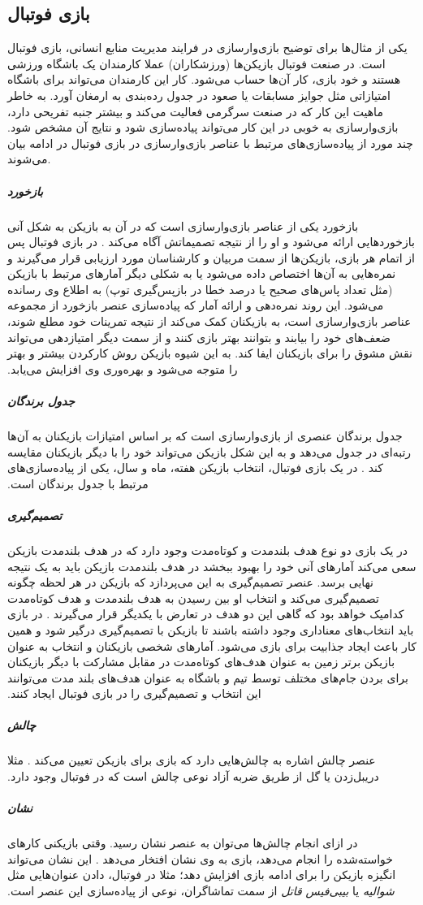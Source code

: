 \subsection{بازی فوتبال}
یکی از مثال‌ها برای توضیح بازی‌وارسازی در فرایند مدیریت منابع انسانی، بازی فوتبال است. در صنعت فوتبال بازیکن‌ها (ورزشکاران) عملا کارمندان یک باشگاه ورزشی هستند و خود بازی، کار آن‌ها حساب می‌شود. کار این کارمندان می‌تواند برای باشگاه امتیازاتی مثل جوایز مسابقات یا صعود در جدول رده‌بندی به ارمغان آورد.
به خاطر ماهیت این کار که در صنعت سرگرمی فعالیت می‌کند و بیشتر جنبه تفریحی دارد، بازی‌وارسازی به خوبی در این کار می‌تواند پیاده‌سازی شود و نتایج آن مشخص شود. چند مورد از پیاده‌سازی‌های مرتبط با عناصر بازی‌وارسازی در بازی فوتبال در ادامه بیان می‌شوند.
\subparagraph{بازخورد}‫
بازخورد یکی از عناصر بازی‌وارسازی است که در آن به بازیکن به شکل آنی بازخوردهایی ارائه می‌شود و او را از نتیجه تصمیماتش آگاه می‌کند \cite{atoz}. در بازی فوتبال پس از اتمام هر بازی، بازیکن‌ها از سمت مربیان و کارشناسان مورد ارزیابی قرار می‌گیرند و نمره‌هایی به آن‌ها اختصاص داده می‌شود یا به شکلی دیگر آمارهای مرتبط با بازیکن (مثل تعداد پاس‌های صحیح یا درصد خطا در بازپس‌گیری توپ) به اطلاع وی رسانده می‌شود. این روند نمره‌دهی و ارائه آمار که پیاده‌سازی عنصر بازخورد از مجموعه عناصر بازی‌وارسازی است، به بازیکنان کمک می‌کند از نتیجه تمرینات خود مطلع شوند، ضعف‌های خود را بیابند و بتوانند بهتر بازی کنند و از سمت دیگر امتیازدهی می‌تواند نقش مشوق را برای بازیکنان ایفا کند. به این شیوه بازیکن روش کارکردن بیشتر و بهتر را متوجه می‌شود و بهره‌وری وی افزایش می‌یابد.
\subparagraph{جدول برندگان}‫
جدول برندگان عنصری از بازی‌وارسازی است که بر اساس امتیازات بازیکنان به آن‌ها رتبه‌ای در جدول می‌دهد و به این شکل بازیکن می‌تواند خود را با دیگر بازیکنان مقایسه کند \cite{atoz}. در یک بازی فوتبال، انتخاب بازیکن هفته، ماه و سال، یکی از پیاده‌سازی‌های مرتبط با جدول برندگان است.
\subparagraph{تصمیم‌گیری}‫
در یک بازی دو نوع هدف بلندمدت و کوتاه‌مدت وجود دارد که در هدف بلندمدت بازیکن سعی می‌کند آمارهای آنی خود را بهبود ببخشد در هدف بلندمدت بازیکن باید به یک نتیجه نهایی برسد. عنصر تصمیم‌گیری به این می‌پردازد که بازیکن در هر لحظه چگونه تصمیم‌گیری می‌کند و انتخاب او بین رسیدن به هدف بلندمدت و هدف کوتاه‌مدت کدامیک خواهد بود که گاهی این دو هدف در تعارض با یکدیگر قرار می‌گیرند \cite{atoz}. در بازی باید انتخاب‌های معناداری وجود داشته باشند تا بازیکن با تصمیم‌گیری درگیر شود و همین کار باعث ایجاد جذابیت برای بازی می‌شود. آمارهای شخصی بازیکنان و انتخاب به عنوان بازیکن برتر زمین به عنوان هدف‌های کوتاه‌مدت در مقابل مشارکت با دیگر بازیکنان برای بردن جام‌های مختلف توسط تیم و باشگاه به عنوان هدف‌های بلند مدت می‌توانند این انتخاب و تصمیم‌گیری را در بازی فوتبال ایجاد کنند.
\subparagraph{چالش}‫
عنصر چالش اشاره به چالش‌هایی دارد که بازی برای بازیکن تعیین می‌کند \cite{atoz}. مثلا دریبل‌زدن یا گل از طریق ضربه آزاد نوعی چالش است که در فوتبال وجود دارد.
\subparagraph{نشان}‫
در ازای انجام چالش‌ها می‌توان به عنصر نشان رسید. وقتی بازیکنی کارهای خواسته‌شده را انجام می‌دهد، بازی به وی نشان افتخار می‌دهد \cite{atoz}. این نشان می‌تواند انگیزه بازیکن را برای ادامه بازی افزایش دهد؛ مثلا در فوتبال، دادن عنوان‌هایی مثل \emph{شوالیه} یا \emph{بیبی‌فیس قاتل} از سمت تماشاگران، نوعی از پیاده‌سازی این عنصر است.
